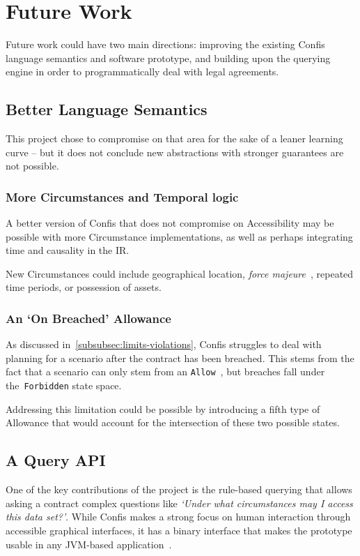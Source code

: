 \section{Future Work}\label{sec:future-work}

Future work could have two main directions: improving the existing Confis language semantics and software prototype, and building upon the querying engine in order to programmatically deal with legal agreements.

\subsection{Better Language Semantics}\label{subsec:future:better-language-semantics}

This project chose to compromise on that area for the sake of a leaner learning curve -- but it does not conclude new abstractions with stronger guarantees are not possible.

\subsubsection{More Circumstances and Temporal logic}\label{subsubsec:future:more-circumstances-and-temporal-logic}
A better version of Confis that does not compromise on Accessibility may be possible with more Circumstance implementations, as well as perhaps integrating time and causality in the IR\@.

New Circumstances could include geographical location, \emph{force majeure}~\cite{forceMajeureDefinition}, repeated time periods, or possession of assets.

\subsubsection{An `On Breached' Allowance}

As discussed in~\autoref{subsubsec:limits-violations}, Confis struggles to deal with planning for a scenario after the contract has been breached.
This stems from the fact that a scenario can only stem from an \texttt{Allow}~, but breaches fall under the~\texttt{Forbidden} state space.

Addressing this limitation could be possible by introducing a fifth type of Allowance that would account for the intersection of these two possible states.

\subsection{A Query API}\label{subsec:future:query-api}
One of the key contributions of the project is the rule-based querying that allows asking a contract complex questions like \emph{`Under what circumstances may I access this data set?'}.
While Confis makes a strong focus on human interaction through accessible graphical interfaces, it has a binary interface that makes the prototype usable in any JVM-based application~\cite{venners1998java}.


